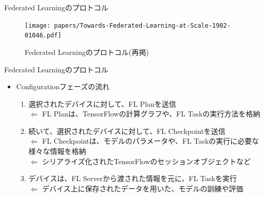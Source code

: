 \documentclass[dvipdfmx,notheorems,t]{beamer}
\begin{document}
\begin{frame}{Federated Learningのプロトコル}

\begin{figure}
	\centering
	\texttt{[image: papers/Towards-Federated-Learning-at-Scale-1902-01046.pdf]}
	\caption{Federated Learningのプロトコル(再掲)~\cite{1902.01046}}
\end{figure}

\end{frame}

\begin{frame}{Federated Learningのプロトコル}

\begin{itemize}
	\item Configurationフェーズの流れ
	\begin{enumerate}
		\item 選択されたデバイスに対して、FL Planを送信 \\
		$\Leftarrow$ FL Planは、TensorFlowの計算グラフや、FL Taskの実行方法を格納
		\newline
		
		\item 続いて、選択されたデバイスに対して、FL Checkpointを送信 \\
		$\Leftarrow$ FL Checkpointは、モデルのパラメータや、FL Taskの実行に必要な様々な情報を格納 \\
		$\Leftarrow$ シリアライズ化されたTensorFlowのセッションオブジェクトなど
		\newline
		
		\item デバイスは、FL Serverから渡された情報を元に、FL Taskを実行 \\
		$\Leftarrow$ デバイス上に保存されたデータを用いた、モデルの訓練や評価
	\end{enumerate}
\end{itemize}

\end{frame}
\end{document}
